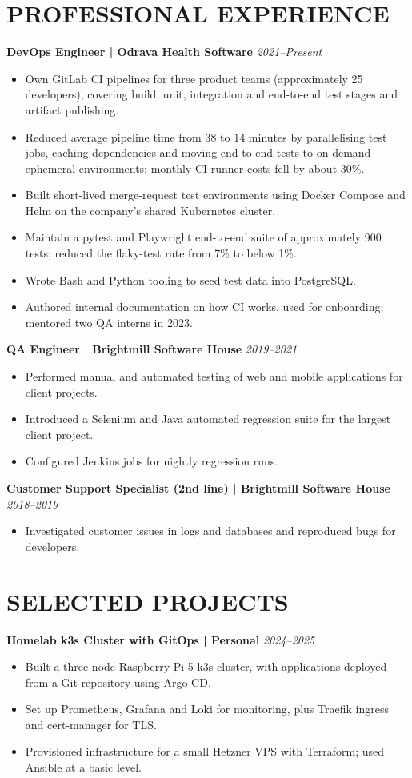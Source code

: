 \documentclass[11pt,a4paper]{article}
\begin{document}
\section*{PROFESSIONAL EXPERIENCE}
\textbf{DevOps Engineer | Odrava Health Software} \hfill \textit{2021--Present}
\begin{itemize}
\item Own GitLab CI pipelines for three product teams (approximately 25 developers), covering build, unit, integration and end-to-end test stages and artifact publishing.
\item Reduced average pipeline time from 38 to 14 minutes by parallelising test jobs, caching dependencies and moving end-to-end tests to on-demand ephemeral environments; monthly CI runner costs fell by about 30\%.
\item Built short-lived merge-request test environments using Docker Compose and Helm on the company's shared Kubernetes cluster.
\item Maintain a pytest and Playwright end-to-end suite of approximately 900 tests; reduced the flaky-test rate from 7\% to below 1\%.
\item Wrote Bash and Python tooling to seed test data into PostgreSQL.
\item Authored internal documentation on how CI works, used for onboarding; mentored two QA interns in 2023.
\end{itemize}

\textbf{QA Engineer | Brightmill Software House} \hfill \textit{2019--2021}
\begin{itemize}
\item Performed manual and automated testing of web and mobile applications for client projects.
\item Introduced a Selenium and Java automated regression suite for the largest client project.
\item Configured Jenkins jobs for nightly regression runs.
\end{itemize}

\textbf{Customer Support Specialist (2nd line) | Brightmill Software House} \hfill \textit{2018--2019}
\begin{itemize}
\item Investigated customer issues in logs and databases and reproduced bugs for developers.
\end{itemize}

\section*{SELECTED PROJECTS}
\textbf{Homelab k3s Cluster with GitOps | Personal} \hfill \textit{2024--2025}
\begin{itemize}
\item Built a three-node Raspberry Pi 5 k3s cluster, with applications deployed from a Git repository using Argo CD.
\item Set up Prometheus, Grafana and Loki for monitoring, plus Traefik ingress and cert-manager for TLS.
\item Provisioned infrastructure for a small Hetzner VPS with Terraform; used Ansible at a basic level.
\end{itemize}
\end{document}
